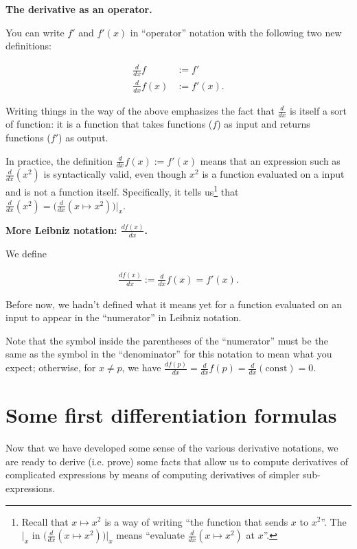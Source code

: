 \documentclass{article}
\begin{document}
\textbf{The derivative as an operator.}
         
You can write $f'$ and $f'(x)$ in ``operator'' notation with the following two new definitions:

\begin{align*}
    \frac{d}{dx}f &:= f' \\ \frac{d}{dx} f(x) &:= f'(x).
\end{align*}

Writing things in the way of the above emphasizes the fact that $\frac{d}{dx}$ is itself a sort of function: it is a function that takes functions ($f$) as input and returns functions ($f'$) as output.
         
In practice, the definition $\frac{d}{dx} f(x) := f'(x)$ means that an expression such as $\frac{d}{dx}(x^2)$ is syntactically valid, even though $x^2$ is a function evaluated on a input and is not a function itself. Specifically, it tells us\footnote{Recall that $x \mapsto x^2$ is a way of writing ``the function that sends $x$ to $x^2$''. The $|_x$ in $\Big( \frac{d}{dx}(x \mapsto x^2)\Big)\Big|_x$ means ``evaluate $\frac{d}{dx}(x \mapsto x^2)$ at $x$''.} that $\frac{d}{dx}(x^2) = \Big( \frac{d}{dx}(x \mapsto x^2)\Big)\Big|_x$.

\vspace{.5cm}

\textbf{More Leibniz notation: $\frac{df(x)}{dx}$.}
         
We define 

\begin{align*}
    \frac{df(x)}{dx} := \frac{d}{dx} f(x) = f'(x).
\end{align*}

Before now, we hadn't defined what it means yet for a function evaluated on an input to appear in the ``numerator'' in Leibniz notation.

Note that the symbol inside the parentheses of the ``numerator'' must be the same as the symbol in the ``denominator'' for this notation to mean what you expect; otherwise, for $x \neq p$, we have $\frac{df(p)}{dx} = \frac{d}{dx} f(p) = \frac{d}{dx} (\text{const}) = 0$.
         
\section*{Some first differentiation formulas}

Now that we have developed some sense of the various derivative notations, we are ready to derive (i.e. prove) some facts that allow us to compute derivatives of complicated expressions by means of computing derivatives of simpler sub-expressions.
\end{document}
